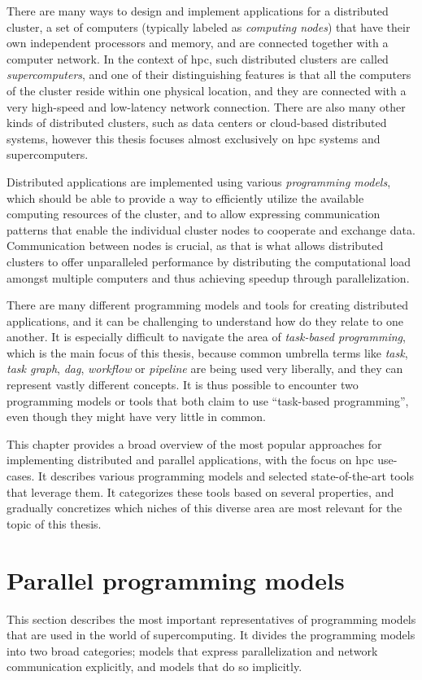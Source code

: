 There are many ways to design and implement applications for a distributed cluster, a set of
computers (typically labeled as \emph{computing nodes}) that have their own independent
processors and memory, and are connected together with a computer network. In the context of
\gls{hpc}, such distributed clusters are called \emph{supercomputers}, and
one of their distinguishing features is that all the computers of the cluster reside within one
physical location, and they are connected with a very high-speed and low-latency network
connection. There are also many other kinds of distributed clusters, such as data centers or
cloud-based distributed systems, however this thesis focuses almost exclusively on
\gls{hpc} systems and supercomputers.

Distributed applications are implemented using various \emph{programming models}, which should be
able to provide a way to efficiently utilize the available computing resources of the cluster, and
to allow expressing communication patterns that enable the individual cluster nodes to cooperate
and exchange data. Communication between nodes is crucial, as that is what allows distributed
clusters to offer unparalleled performance by distributing the computational load amongst multiple
computers and thus achieving speedup through parallelization.

There are many different programming models and tools for creating distributed applications, and it
can be challenging to understand how do they relate to one another. It is especially difficult to
navigate the area of \emph{task-based programming}, which is the main focus of this thesis, because
common umbrella terms like \emph{task}, \emph{task graph},
\emph{\gls{dag}}, \emph{workflow} or \emph{pipeline} are being
used very liberally, and they can represent vastly different concepts. It is thus possible to
encounter two programming models or tools that both claim to use ``task-based programming'', even
though they might have very little in common.

This chapter provides a broad overview of the most popular approaches for implementing distributed
and parallel applications, with the focus on \gls{hpc} use-cases. It describes
various programming models and selected state-of-the-art tools that leverage them. It categorizes
these tools based on several properties, and gradually concretizes which niches of this diverse
area are most relevant for the topic of this thesis.

\section{Parallel programming models}
This section describes the most important representatives of programming models that are used in
the world of supercomputing. It divides the programming models into two broad categories; models
that express parallelization and network communication explicitly, and models that do so
implicitly.

